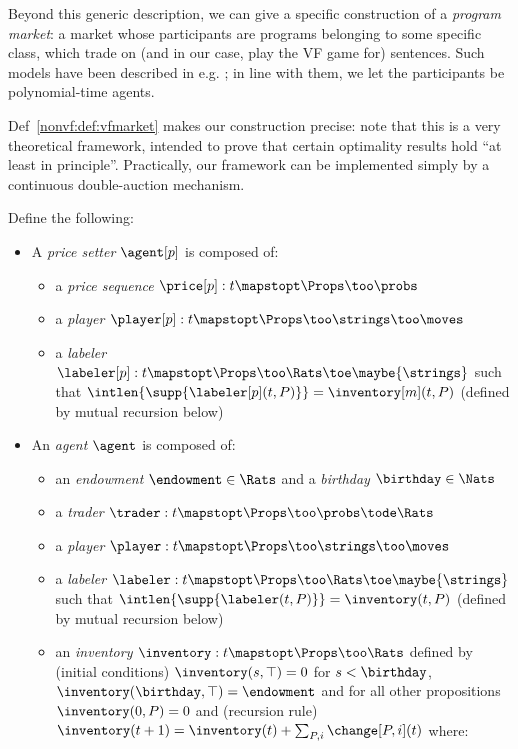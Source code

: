 Beyond this generic description, we can give a specific construction of a \emph{program market}: a market whose participants are programs belonging to some specific class, which trade on (and in our case, play the VF game for) sentences. Such models have been described in e.g. \citet{garrabrantLogicalInduction2016, oesterheldTheoryBoundedInductive2023}; in line with them, we let the participants be polynomial-time agents.

Def~\ref{nonvf:def:vfmarket} makes our construction precise: note that this is a very theoretical framework, intended to prove that certain optimality results hold ``at least in principle''. Practically, our framework can be implemented simply by a continuous double-auction mechanism.

\begin{definition}
    Define the following:
    \begin{itemize}
        \item A \emph{price setter} $\agent[p]$ is composed of:
        \begin{itemize}
            \item a \emph{price sequence} $\price[p]:t\mapstopt\Props\too\probs$
            \item a \emph{player} $\player[p]:t\mapstopt\Props\too\strings\too\moves$
            \item a \emph{labeler} $\labeler[p]:t\mapstopt\Props\too\Rats\toe\maybe{\strings}$ such that $\intlen{\supp{\labeler[p](t,P)}}=\inventory[m](t,P)$ (defined by mutual recursion below)
        \end{itemize}
        \item An \emph{agent} $\agent$ is composed of:
        \begin{itemize}
            \item an \emph{endowment} $\endowment\in\Rats$ and a \emph{birthday} $\birthday\in\Nats$
            \item a \emph{trader} $\trader:t\mapstopt\Props\too\probs\tode\Rats$
            \item a \emph{player} $\player:t\mapstopt\Props\too\strings\too\moves$
            \item a \emph{labeler} $\labeler:t\mapstopt\Props\too\Rats\toe\maybe{\strings}$ such that $\intlen{\supp{\labeler(t,P)}}=\inventory(t,P)$ (defined by mutual recursion below)
            \item an \emph{inventory} $\inventory:t\mapstopt \Props\too\Rats$ defined by (initial conditions) $\inventory(s,\top)=0$ for $s<\birthday$, $\inventory(\birthday,\top)=\endowment$ and for all other propositions $\inventory(0,P)=0$ and (recursion rule) $\inventory(t+1)=\inventory(t)+\sum_{P,i}\change[P,i](t)$ where:

\end{itemize}
\end{itemize}
\end{definition}
